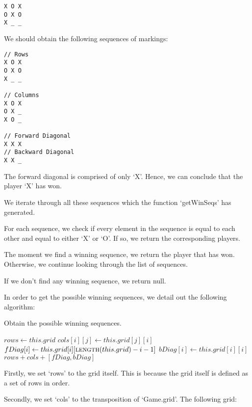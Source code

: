 \documentclass{article}
\begin{document}
\begin{verbatim}
X O X
O X O
X _ _
\end{verbatim}

We should obtain the following sequences of markings:

\begin{verbatim}
// Rows
X O X
O X O
X _ _

// Columns
X O X
O X _
X O _

// Forward Diagonal
X X X
// Backward Diagonal
X X _
\end{verbatim}

The forward diagonal is comprised of only `X'. Hence, we can conclude that the player `X' has won.

We iterate through all these sequences which the function `getWinSeqs' has generated.

For each sequence, we check if every element in the sequence is equal to each other and equal to either `X' or `O'. If so, we return the corresponding players.

The moment we find a winning sequence, we return the player that has won. Otherwise, we continue looking through the list of sequences.

If we don't find any winning sequence, we return null.

In order to get the possible winning sequences, we detail out the following algorithm:

\begin{algorithm}
\caption{Obtain the possible winning sequences.}

\begin{algorithmic}[1]
  \State $rows \gets this.grid$
      \State $cols[i][j] \gets this.grid[j][i]$
    \EndFor
  \EndFor
    \State $fDiag[i] \gets this.grid[i][\Call{length}{this.grid} - i - 1]$
  \EndFor
    \State $bDiag[i] \gets this.grid[i][i]$
  \EndFor
  \Return $rows + cols + [fDiag, bDiag]$
\EndProcedure
\end{algorithmic}
\end{algorithm}

Firstly, we set `rows' to the grid itself. This is because the grid itself is defined as a set of rows in order.

Secondly, we set `cols' to the transposition of `Game.grid'. The following grid:
\end{document}
